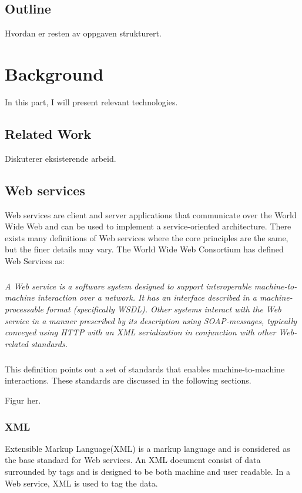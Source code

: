 \documentclass[USenglish]{ifimaster}
\begin{document}
\section{Outline}
Hvordan er resten av oppgaven strukturert.


\chapter{Background}
In this part, I will present relevant technologies.
\section{Related Work}
Diskuterer eksisterende arbeid.



\section{Web services}
\label{web-services}
Web services are client and server applications that communicate over the World Wide Web and can be used to implement a service-oriented architecture. There exists many definitions of Web services where the core principles are the same, but the finer details may vary. The World Wide Web Consortium has defined Web Services as\cite{wrc-web-service}:
\paragraph{}
\textit{A Web service is a software system designed to support interoperable machine-to-machine interaction over a network. It has an interface described in a machine-processable format (specifically WSDL). Other systems interact with the Web service in a manner prescribed by its description using SOAP-messages, typically conveyed using HTTP with an XML serialization in conjunction with other Web-related standards.}

\paragraph{}
This definition points out a set of standards that enables machine-to-machine interactions. These standards are discussed in the following sections.

Figur her.

\subsection{XML}
Extensible Markup Language(XML) is a markup language and is considered as the base standard for Web services. An XML document consist of data surrounded by tags and is designed to be both machine and user readable. In a Web service, XML is used to tag the data.
\end{document}
